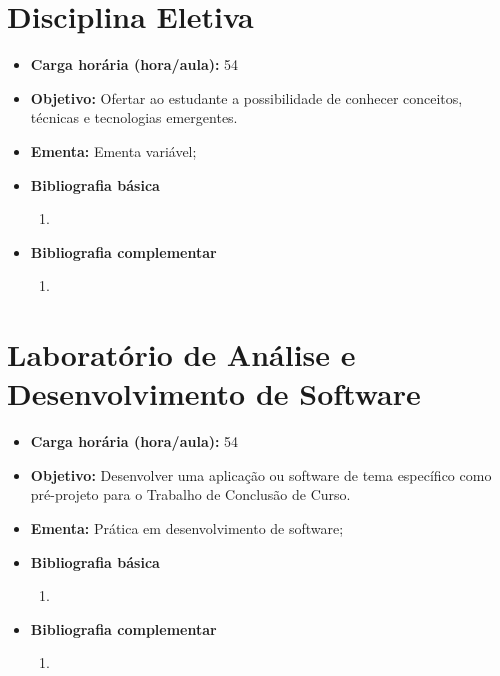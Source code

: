 \documentclass[11pt,fleqn]{book} %
\begin{document}
\newpage
\section{Disciplina Eletiva}\label{5_opt}
\begin{itemize}
	\item \textbf{Carga horária (hora/aula):} 54
	\item \textbf{Objetivo:} Ofertar ao estudante a possibilidade de conhecer conceitos, técnicas e tecnologias emergentes.
	\item \textbf{Ementa:} 
	Ementa variável;
	\item \textbf{Bibliografia básica}
	\begin{enumerate}
		\item 
	\end{enumerate}
	\item \textbf{Bibliografia complementar}
	\begin{enumerate}
		\item 	
	\end{enumerate}	
\end{itemize}


\newpage
\section{Laboratório de Análise e Desenvolvimento de Software}\label{5_lab}
\begin{itemize}
	\item \textbf{Carga horária (hora/aula):} 54
	\item \textbf{Objetivo:} Desenvolver uma aplicação ou software de tema específico como pré-projeto para o Trabalho de Conclusão de Curso.
	\item \textbf{Ementa:} 
	Prática em desenvolvimento de software;
	\item \textbf{Bibliografia básica}
	\begin{enumerate}
		\item 
	\end{enumerate}
	\item \textbf{Bibliografia complementar}
	\begin{enumerate}
		\item 	
	\end{enumerate}	
\end{itemize}
\end{document}
